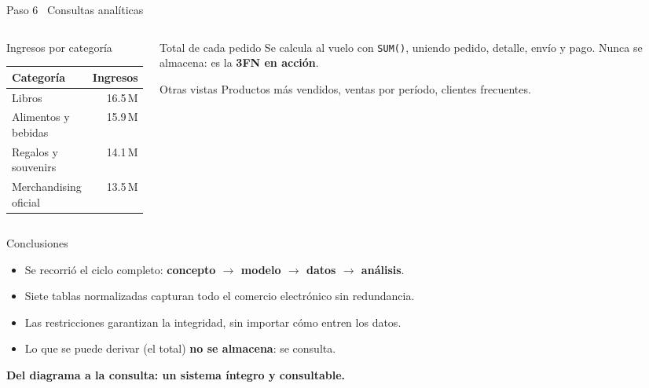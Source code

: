 \documentclass[aspectratio=169,10pt]{beamer}
\begin{document}
\begin{frame}{Paso 6 \textbar\ Consultas analíticas}
  \begin{columns}[t]
    \begin{column}{0.46\textwidth}
      \begin{block}{Ingresos por categoría}
        \small
        \begin{tabular}{lr}
          \toprule
          Categoría & Ingresos \\
          \midrule
          Libros & 16.5\,M \\
          Alimentos y bebidas & 15.9\,M \\
          Regalos y souvenirs & 14.1\,M \\
          Merchandising oficial & 13.5\,M \\
          \bottomrule
        \end{tabular}
      \end{block}
    \end{column}
    \begin{column}{0.50\textwidth}
      \begin{block}{Total de cada pedido}
        \small
        Se calcula al vuelo con \texttt{SUM()}, uniendo pedido, detalle, envío y pago.
        Nunca se almacena: es la \textbf{3FN en acción}.
      \end{block}
      \begin{block}{Otras vistas}
        \small Productos más vendidos, ventas por período, clientes frecuentes.
      \end{block}
    \end{column}
  \end{columns}
\end{frame}

\begin{frame}{Conclusiones}
  \begin{itemize}
    \item Se recorrió el ciclo completo: \textbf{concepto $\rightarrow$ modelo $\rightarrow$ datos $\rightarrow$ análisis}.
    \item Siete tablas normalizadas capturan todo el comercio electrónico sin redundancia.
    \item Las restricciones garantizan la integridad, sin importar cómo entren los datos.
    \item Lo que se puede derivar (el total) \textbf{no se almacena}: se consulta.
  \end{itemize}
  \vfill
  \begin{center}
    \color{urAzul}\large\textbf{Del diagrama a la consulta: un sistema íntegro y consultable.}
  \end{center}
\end{frame}
\end{document}
